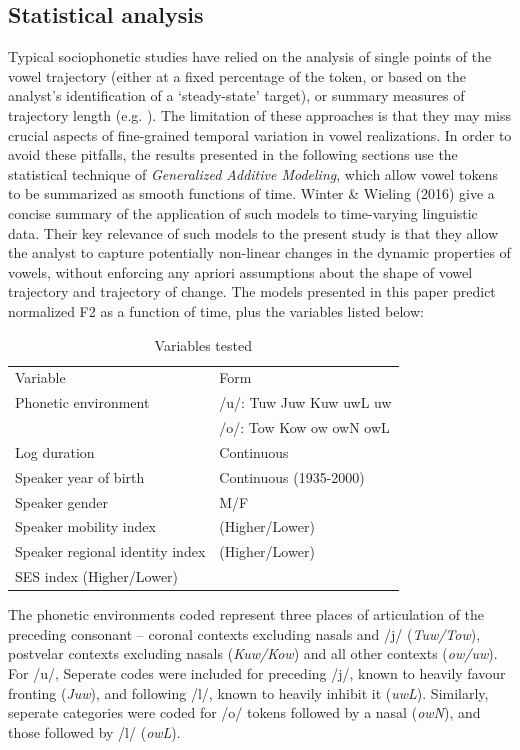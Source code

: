 \documentclass[12pt]{article}
\begin{document}
\subsection{Statistical analysis}

Typical sociophonetic studies have relied on the analysis of single points of the vowel trajectory (either at a fixed percentage of the token, or based on the analyst's identification of a `steady-state' target), or summary measures of trajectory length (e.g. ). The limitation of these approaches is that they may miss crucial aspects of fine-grained temporal variation in vowel realizations. In order to avoid these pitfalls, the results presented in the following sections use the statistical technique of \textit{Generalized Additive Modeling}, which allow vowel tokens to be summarized as smooth functions of time. Winter \& Wieling (2016) give a concise summary of the application of such models to time-varying linguistic data. Their key relevance of such models to the present study is that they allow the analyst to capture potentially non-linear changes in the dynamic properties of vowels, without enforcing any apriori assumptions about the shape of vowel trajectory and trajectory of change. The models presented in this paper predict normalized F2 as a function of time, plus the variables listed below:

\vspace*{6pt}
\begin{table}[!htbp]
\centering
\begin{tabular}{l|l}
Variable&Form \\
Phonetic environment & /u/: Tuw Juw Kuw uwL uw\\&/o/: Tow Kow ow owN owL\\
Log duration& Continuous \\
Speaker year of birth& Continuous (1935-2000)\\
Speaker gender& M/F \\
Speaker mobility index & (Higher/Lower) \\
Speaker regional identity index& (Higher/Lower) \\
SES index (Higher/Lower)\\
\end{tabular}
\caption{Variables tested}
\end{table}
\vspace*{6pt}

The phonetic environments coded represent three places of articulation of the preceding consonant -- coronal contexts excluding nasals and /j/ (\textit{Tuw/Tow}), postvelar contexts excluding nasals (\textit{Kuw/Kow}) and all other contexts (\textit{ow/uw}). For /u/, Seperate codes were included for preceding /j/, known to heavily favour fronting (\textit{Juw}), and following /l/, known to heavily inhibit it (\textit{uwL}). Similarly, seperate categories were coded for /o/ tokens followed by a nasal (\textit{owN}), and those followed by /l/ (\textit{owL}).
\end{document}
